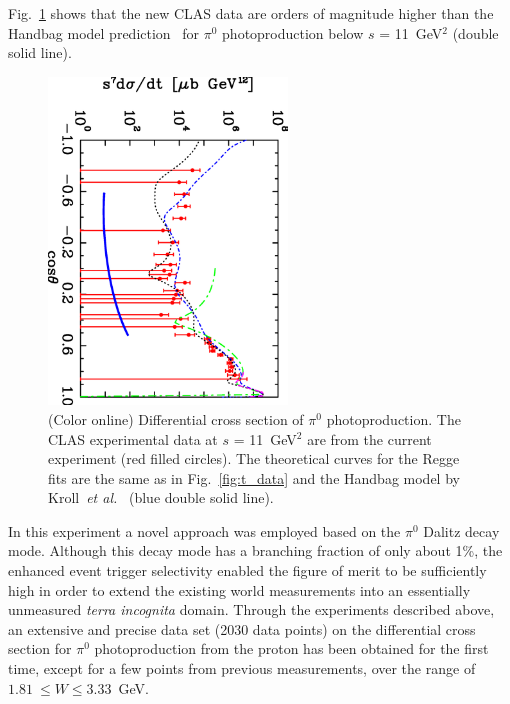 \documentclass[aps,prc,twocolumn,floatfix,showpacs,preprintnumbers,amsmath,amssymb,superscriptaddress,linenumbers]{revtex4-1}
\begin{document}
Fig.~\ref{fig:kroll} shows that the new CLAS data are orders of 
magnitude higher than the Handbag model prediction~\cite{Huang:2000kd} for $\pi^0$ 
photoproduction below $s$ = 11~GeV$^2$ (double 
solid line).
\begin{figure}
\centerline{
        \includegraphics[width=2.5in, angle=90]{kroll.eps}}

        \caption {(Color online) Differential cross section 
	of $\pi^0$ photoproduction. The CLAS experimental data 
	at $s$ = 11~GeV$^2$ are from the current experiment (red 
	filled circles). The theoretical curves for the Regge 
	fits are the same as in Fig.~\protect\ref{fig:t_data} 
	and the Handbag model by Kroll~\textit{et 
	al.}~\protect\cite{Huang:2000kd} (blue double solid 
	line).} \label{fig:kroll}
\end{figure}


In this experiment a novel approach was employed based on the $\pi^{0}$ Dalitz decay 
mode. Although this decay mode has a branching fraction of only about 1\%, 
the enhanced event trigger selectivity enabled the figure of merit to be 
sufficiently high in order to extend the existing world measurements into 
an essentially unmeasured {\it terra incognita} domain.
%
Through the experiments described above, an extensive and precise 
data set (2030 data points) on the differential cross section for 
$\pi^0$ photoproduction from the proton has been obtained 
for the first time, except for a few points from previous measurements, 
over the range of $1.81~\leq W\leq 3.33$~GeV. 
\end{document}
